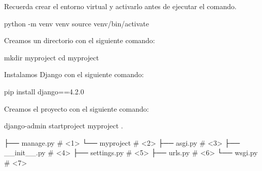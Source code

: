 \documentclass[
  a4paper,
  DIV=11,
  numbers=noendperiod,
  onepage,
  openany]{scrreprt}
\newenvironment{Shaded}{\begin{snugshade}}{\end{snugshade}}
\newcommand{\AttributeTok}[1]{\textcolor[rgb]{0.40,0.45,0.13}{#1}}
\newcommand{\BuiltInTok}[1]{\textcolor[rgb]{0.00,0.23,0.31}{#1}}
\newcommand{\ExtensionTok}[1]{\textcolor[rgb]{0.00,0.23,0.31}{#1}}
\newcommand{\FunctionTok}[1]{\textcolor[rgb]{0.28,0.35,0.67}{#1}}
\newcommand{\NormalTok}[1]{\textcolor[rgb]{0.00,0.23,0.31}{#1}}
\begin{document}
\begin{tcolorbox}[enhanced jigsaw, title=\textcolor{quarto-callout-tip-color}{\faLightbulb}\hspace{0.5em}{Tip}, colback=white, rightrule=.15mm, opacityback=0, colframe=quarto-callout-tip-color-frame, titlerule=0mm, opacitybacktitle=0.6, breakable, coltitle=black, colbacktitle=quarto-callout-tip-color!10!white, bottomtitle=1mm, toptitle=1mm, left=2mm, arc=.35mm, toprule=.15mm, leftrule=.75mm, bottomrule=.15mm]

Recuerda crear el entorno virtual y activarlo antes de ejecutar el
comando.

\begin{Shaded}
\begin{Highlighting}[]
\ExtensionTok{python} \AttributeTok{{-}m}\NormalTok{ venv venv}
\BuiltInTok{source}\NormalTok{ venv/bin/activate}
\end{Highlighting}
\end{Shaded}

Creamos un directorio con el siguiente comando:

\begin{Shaded}
\begin{Highlighting}[]
\FunctionTok{mkdir}\NormalTok{ myproject}
\BuiltInTok{cd}\NormalTok{ myproject}
\end{Highlighting}
\end{Shaded}

Instalamos Django con el siguiente comando:

\begin{Shaded}
\begin{Highlighting}[]
\ExtensionTok{pip}\NormalTok{ install django==4.2.0}
\end{Highlighting}
\end{Shaded}

Creamos el proyecto con el siguiente comando:

\begin{Shaded}
\begin{Highlighting}[]
\ExtensionTok{django{-}admin}\NormalTok{ startproject myproject .}
\end{Highlighting}
\end{Shaded}

\end{tcolorbox}

\label{annotated-cell-182}%
\begin{Shaded}
\begin{Highlighting}[]
\NormalTok{├── manage.py \# \textless{}1\textgreater{}}
\NormalTok{└── myproject \# \textless{}2\textgreater{}}
\NormalTok{    ├── asgi.py \# \textless{}3\textgreater{}}
\NormalTok{    ├── \_\_init\_\_.py \# \textless{}4\textgreater{}}
\NormalTok{    ├── settings.py \# \textless{}5\textgreater{}}
\NormalTok{    ├── urls.py \# \textless{}6\textgreater{}}
\NormalTok{    └── wsgi.py \# \textless{}7\textgreater{}}
\end{Highlighting}
\end{Shaded}
\end{document}
